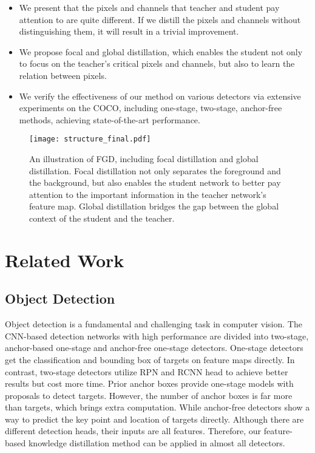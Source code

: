 \documentclass[10pt,twocolumn,letterpaper]{article}
\begin{document}
\begin{itemize}
  \item
  We present that the pixels and channels that teacher and student pay attention to are quite different. If we distill the pixels and channels without distinguishing them, it will result in a trivial improvement.
  \item
  We propose focal and global distillation, which enables the student not only to focus on the teacher's critical pixels and channels, but also to learn the relation between pixels.
  \item
  We verify the effectiveness of our method on various detectors via extensive experiments on the COCO\cite{lin2014microsoft}, including one-stage, two-stage, anchor-free methods, achieving state-of-the-art performance.
\end{itemize}

\begin{figure*}
  \centering
  \texttt{[image: structure\_final.pdf]}
  \caption{An illustration of FGD, including focal distillation and global distillation. Focal distillation not only separates the foreground and the background, but also enables the student network to better pay attention to the important information in the teacher network's feature map. Global distillation bridges the gap between the global context of the student and the teacher.}
  \label{figure:structure}
\end{figure*}

\section{Related Work}
\label{sec:related work}

\subsection{Object Detection}

Object detection is a fundamental and challenging task in computer vision. The CNN-based detection networks with high performance are divided into two-stage\cite{ren2015faster,he2017mask,cai2018cascade}, anchor-based one-stage\cite{liu2016ssd,lin2017focal,redmon2018yolov3} and anchor-free one-stage detectors\cite{tian2019fcos,yang2019reppoints,duan2019centernet}. One-stage detectors get the classification and bounding box of targets on feature maps directly. In contrast, two-stage detectors utilize RPN and RCNN head to achieve better results but cost more time. Prior anchor boxes provide one-stage models with proposals to detect targets. However, the number of anchor boxes is far more than targets, which brings extra computation. While anchor-free detectors show a way to predict the key point and location of targets directly. Although there are different detection heads, their inputs are all features. Therefore, our feature-based knowledge distillation method can be applied in almost all detectors.
\end{document}
